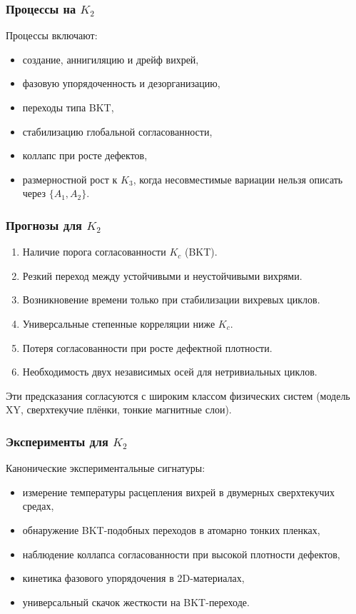 \subsubsection{Процессы на \texorpdfstring{$K_2$}{K_2}}

Процессы включают:
\begin{itemize}
    \item создание, аннигиляцию и дрейф вихрей,
    \item фазовую упорядоченность и дезорганизацию,
    \item переходы типа BKT,
    \item стабилизацию глобальной согласованности,
    \item коллапс при росте дефектов,
    \item размерностной рост к $K_3$, когда несовместимые вариации
          нельзя описать через $\{A_1, A_2\}$.
\end{itemize}

\subsubsection{Прогнозы для \texorpdfstring{$K_2$}{K_2}}

\begin{enumerate}
    \item Наличие порога согласованности $K_c$ (BKT).
    \item Резкий переход между устойчивыми и неустойчивыми вихрями.
    \item Возникновение времени только при стабилизации вихревых циклов.
    \item Универсальные степенные корреляции ниже $K_c$.
    \item Потеря согласованности при росте дефектной плотности.
    \item Необходимость двух независимых осей для нетривиальных циклов.
\end{enumerate}

Эти предсказания согласуются с широким классом физических систем (модель XY,
сверхтекучие плёнки, тонкие магнитные слои).

\subsubsection{Эксперименты для \texorpdfstring{$K_2$}{K_2}}

Канонические экспериментальные сигнатуры:
\begin{itemize}
    \item измерение температуры расцепления вихрей в двумерных сверхтекучих средах,
    \item обнаружение BKT-подобных переходов в атомарно тонких пленках,
    \item наблюдение коллапса согласованности при высокой плотности дефектов,
    \item кинетика фазового упорядочения в 2D-материалах,
    \item универсальный скачок жесткости на BKT-переходе.
\end{itemize}


